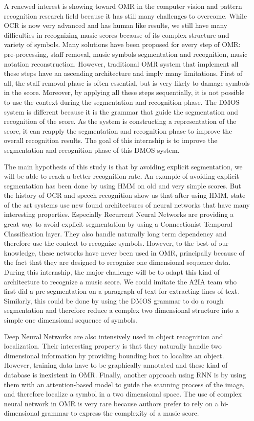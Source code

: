 \documentclass[11pt]{sdm}
\begin{document}
A renewed interest is showing toward OMR in the computer vision and pattern recognition research field because it has still many challenges to overcome.
While OCR is now very advanced and has human like results, we still have many difficulties in recognizing music scores because of its complex structure and variety of symbols.
Many solutions have been proposed for every step of OMR: pre-processing, staff removal, music symbols segmentation and recognition, music notation reconstruction.
However, traditional OMR system that implement all these steps have an ascending architecture and imply many limitations.
First of all, the staff removal phase is often essential, but is very likely to damage symbols in the score.
Moreover, by applying all these steps sequentially, it is not possible to use the context during the segmentation and recognition phase.
The DMOS system is different because it is the grammar that guide the segmentation and recognition of the score.
As the system is constructing a representation of the score, it can reapply the segmentation and recognition phase to improve the overall recognition results.
The goal of this internship is to improve the segmentation and recognition phase of this DMOS system.

The main hypothesis of this study is that by avoiding explicit segmentation, we will be able to reach a better recognition rate.
An example of avoiding explicit segmentation has been done by using HMM on old and very simple scores.
But the history of OCR and speech recognition show us that after using HMM, state of the art systems use new found architectures of neural networks that have many interesting properties.
Especially Recurrent Neural Networks are providing a great way to avoid explicit segmentation by using a Connectionist Temporal Classification layer.
They also handle naturally long term dependency and therefore use the context to recognize symbols.
However, to the best of our knowledge, these networks have never been used in OMR, principally because of the fact that they are designed to recognize one dimensional sequence data.
During this internship, the major challenge will be to adapt this kind of architecture to recognize a music score.
We could imitate the A2IA team who first did a pre segmentation on a paragraph of text for extracting lines of text.
Similarly, this could be done by using the DMOS grammar to do a rough segmentation and therefore reduce a complex two dimensional structure into a simple one dimensional sequence of symbols.

Deep Neural Networks are also intensively used in object recognition and localization.
Their interesting property is that they naturally handle two dimensional information by providing bounding box to localize an object.
However, training data have to be graphically annotated and these kind of database is inexistent in OMR.
Finally, another approach using RNN is by using them with an attention-based model to guide the scanning process of the image, and therefore localize a symbol in a two dimensional space.
The use of complex neural network in OMR is very rare because authors prefer to rely on a bi-dimensional grammar to express the complexity of a music score.
\end{document}
